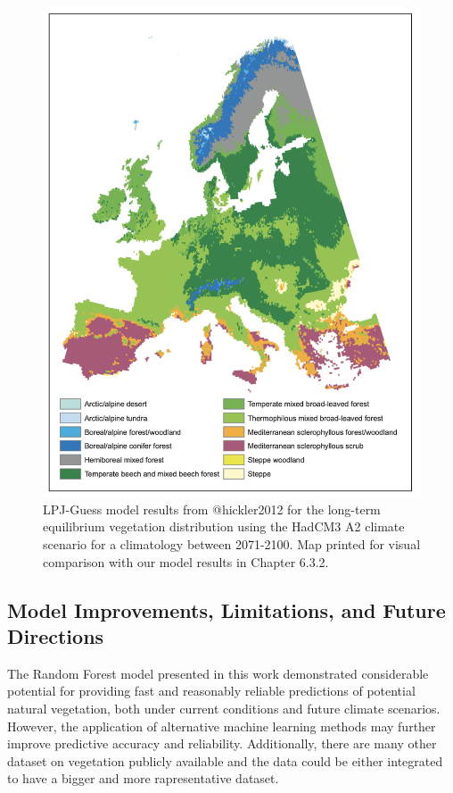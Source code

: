 \documentclass[
]{krantz}
\begin{document}
\begin{figure}

{\centering \includegraphics[width=1\linewidth]{work/05-naturalveg/figures/maps_comparison} 

}

\caption{ LPJ-Guess model results from @hickler2012 for the long-term equilibrium vegetation distribution using the HadCM3 A2 climate scenario for a climatology between 2071-2100. Map printed for visual comparison with our model results in Chapter 6.3.2. }\label{fig:mapcomp}
\end{figure}

\subsection{Model Improvements, Limitations, and Future Directions}\label{model-improvements-limitations-and-future-directions}

The Random Forest model presented in this work demonstrated considerable potential for providing fast and reasonably reliable predictions of potential natural vegetation, both under current conditions and future climate scenarios. However, the application of alternative machine learning methods may further improve predictive accuracy and reliability. Additionally, there are many other dataset on vegetation publicly available and the data could be either integrated to have a bigger and more rapresentative dataset.
\end{document}
